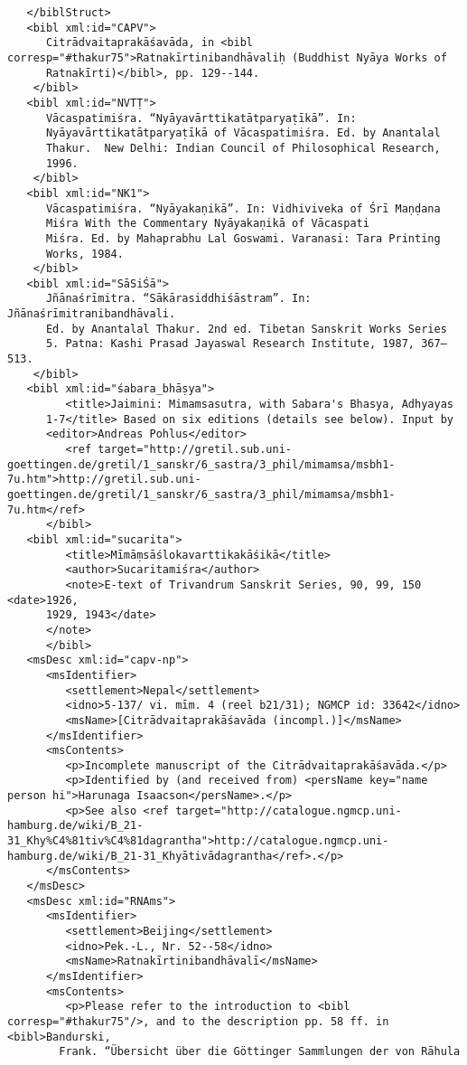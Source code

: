 \documentclass[article,12pt,a4paper]{memoir}%
\begin{document}
\begin{verbatim}
   </biblStruct>
   <bibl xml:id="CAPV">
	  Citrādvaitaprakāśavāda, in <bibl corresp="#thakur75">Ratnakīrtinibandhāvaliḥ (Buddhist Nyāya Works of
	  Ratnakīrti)</bibl>, pp. 129--144.
	</bibl>
   <bibl xml:id="NVTṬ">
	  Vācaspatimiśra. “Nyāyavārttikatātparyaṭīkā”. In:
	  Nyāyavārttikatātparyaṭīkā of Vācaspatimiśra. Ed. by Anantalal
	  Thakur.  New Delhi: Indian Council of Philosophical Research,
	  1996.
	</bibl>
   <bibl xml:id="NK1">
	  Vācaspatimiśra. “Nyāyakaṇikā”. In: Vidhiviveka of Śrī Maṇḍana
	  Miśra With the Commentary Nyāyakaṇikā of Vācaspati
	  Miśra. Ed. by Mahaprabhu Lal Goswami. Varanasi: Tara Printing
	  Works, 1984.
	</bibl>
   <bibl xml:id="SāSiŚā">
	  Jñānaśrīmitra. “Sākārasiddhiśāstram”. In: Jñānaśrīmitranibandhāvali.
	  Ed. by Anantalal Thakur. 2nd ed. Tibetan Sanskrit Works Series
	  5. Patna: Kashi Prasad Jayaswal Research Institute, 1987, 367–513.
	</bibl>
   <bibl xml:id="śabara_bhāṣya">
	     <title>Jaimini: Mimamsasutra, with Sabara's Bhasya, Adhyayas
	  1-7</title> Based on six editions (details see below). Input by
	  <editor>Andreas Pohlus</editor>
	     <ref target="http://gretil.sub.uni-goettingen.de/gretil/1_sanskr/6_sastra/3_phil/mimamsa/msbh1-7u.htm">http://gretil.sub.uni-goettingen.de/gretil/1_sanskr/6_sastra/3_phil/mimamsa/msbh1-7u.htm</ref>
	  </bibl>
   <bibl xml:id="sucarita">
	     <title>Mīmāṃsāślokavarttikakāśikā</title>
	     <author>Sucaritamiśra</author>
	     <note>E-text of Trivandrum Sanskrit Series, 90, 99, 150 <date>1926,
	  1929, 1943</date>
      </note>  
	  </bibl>
   <msDesc xml:id="capv-np">
      <msIdentifier>
         <settlement>Nepal</settlement>
         <idno>5-137/ vi. mīm. 4 (reel b21/31); NGMCP id: 33642</idno>
         <msName>[Citrādvaitaprakāśavāda (incompl.)]</msName>
      </msIdentifier>
      <msContents>
         <p>Incomplete manuscript of the Citrādvaitaprakāśavāda.</p>
         <p>Identified by (and received from) <persName key="name person hi">Harunaga Isaacson</persName>.</p>
         <p>See also <ref target="http://catalogue.ngmcp.uni-hamburg.de/wiki/B_21-31_Khy%C4%81tiv%C4%81dagrantha">http://catalogue.ngmcp.uni-hamburg.de/wiki/B_21-31_Khyātivādagrantha</ref>.</p>
      </msContents>
   </msDesc>
   <msDesc xml:id="RNAms">
      <msIdentifier>
         <settlement>Beijing</settlement>
         <idno>Pek.-L., Nr. 52--58</idno>
         <msName>Ratnakīrtinibandhāvalī</msName>
      </msIdentifier>
      <msContents>
         <p>Please refer to the introduction to <bibl corresp="#thakur75"/>, and to the description pp. 58 ff. in <bibl>Bandurski,
	    Frank. “Übersicht über die Göttinger Sammlungen der von Rāhula

\end{verbatim}
\end{document}
